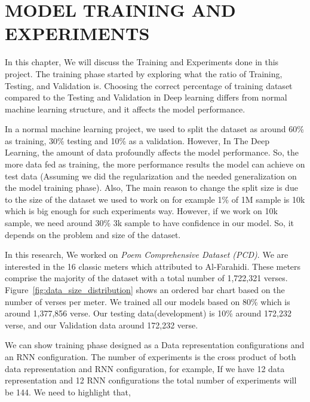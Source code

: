 \chapter{\uppercase{Model Training and Experiments}}\label{ch_model_training}

In this chapter, We will discuss the Training and Experiments done in this project. The training phase started by exploring what the ratio of Training, Testing, and Validation is. Choosing the correct percentage of training dataset compared to the Testing and Validation in Deep learning differs from normal machine learning structure, and it affects the model performance.

In a normal machine learning project, we used to split the dataset as around 60\% as training, 30\% testing and 10\% as a validation. However, In The Deep Learning, the amount of data profoundly affects the model performance. So, the more data fed as training, the more performance results the model can achieve on test data (Assuming we did the regularization and the needed generalization on the model training phase). Also, The main reason to change the split size is due to the size of the dataset we used to work on for example 1\% of 1M sample is 10k which is big enough for such experiments way. However, if we work on 10k sample, we need around 30\% 3k sample to have confidence in our model. So, it depends on the problem and size of the dataset.

In this research, We worked on \textit{Poem Comprehensive Dataset (PCD)}\cite{ArabicpoetryDS}. We are interested in the 16 classic meters which attributed to Al-Farahidi. These meters comprise the majority of the dataset with a total number of 1,722,321 verses. Figure~\ref{fig:data_size_distribution} shows an ordered bar chart based on the number of verses per meter. We trained all our models based on 80\% which is around 1,377,856 verse. Our testing data(development) is 10\% around 172,232 verse, and our Validation data around 172,232 verse.

We can show training phase designed as a Data representation configurations and an RNN configuration. The number of experiments is the cross product of both data representation and RNN configuration, for example, If we have 12 data representation and 12 RNN configurations the total number of experiments will be 144. We need to highlight that,

